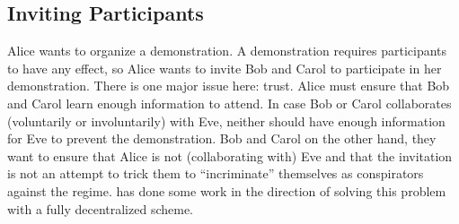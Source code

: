 \subsection{Inviting Participants}
\label{InvitingParticipants}

%
%
%

Alice wants to organize a demonstration.
A demonstration requires participants to have any effect, so Alice wants to 
invite Bob and Carol to participate in her demonstration.
There is one major issue here: trust.
Alice must ensure that Bob and Carol learn enough information to attend.
In case Bob or Carol collaborates (voluntarily or involuntarily) with Eve, 
neither should have enough information for Eve to prevent the demonstration.
Bob and Carol on the other hand, they want to ensure that Alice is not 
(collaborating with) Eve and that the invitation is not an attempt to trick 
them to \enquote{incriminate} themselves as conspirators against the regime.
\Textcite{EventsInvitations} has done some work in the direction of solving 
this problem with a fully decentralized scheme.

